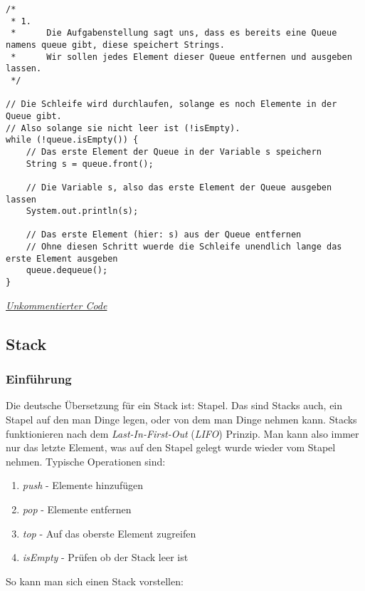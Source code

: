 \begin{center}
\begin{lstlisting}
/*
 * 1. 
 *      Die Aufgabenstellung sagt uns, dass es bereits eine Queue namens queue gibt, diese speichert Strings.
 *      Wir sollen jedes Element dieser Queue entfernen und ausgeben lassen.
 */

// Die Schleife wird durchlaufen, solange es noch Elemente in der Queue gibt.
// Also solange sie nicht leer ist (!isEmpty).
while (!queue.isEmpty()) {
    // Das erste Element der Queue in der Variable s speichern
    String s = queue.front();

    // Die Variable s, also das erste Element der Queue ausgeben lassen
    System.out.println(s);

    // Das erste Element (hier: s) aus der Queue entfernen
    // Ohne diesen Schritt wuerde die Schleife unendlich lange das erste Element ausgeben
    queue.dequeue();
}
\end{lstlisting}
\href{https://raw.githubusercontent.com/tim-tm/informatik-notes/main/code/Queue_Beispiel4.java}{\textit{Unkommentierter Code}} \\
\end{center}

\subsection{Stack}
\subsubsection{Einführung}

\begin{flushleft}
    Die deutsche Übersetzung für ein Stack ist: Stapel.
    Das sind Stacks auch, ein Stapel auf den man Dinge legen, oder von dem man Dinge nehmen kann.
    Stacks funktionieren nach dem \textit{Last-In-First-Out} (\textit{LIFO}) Prinzip.
    Man kann also immer nur das letzte Element, was auf den Stapel gelegt wurde wieder vom Stapel nehmen.
    Typische Operationen sind:
    \begin{enumerate}
        \item {
                \textit{push} - Elemente hinzufügen
            }
        \item {
                \textit{pop} - Elemente entfernen
            }
        \item {
                \textit{top} - Auf das oberste Element zugreifen
            }
        \item {
                \textit{isEmpty} - Prüfen ob der Stack leer ist
            }
    \end{enumerate}
    So kann man sich einen Stack vorstellen:
\end{flushleft}

